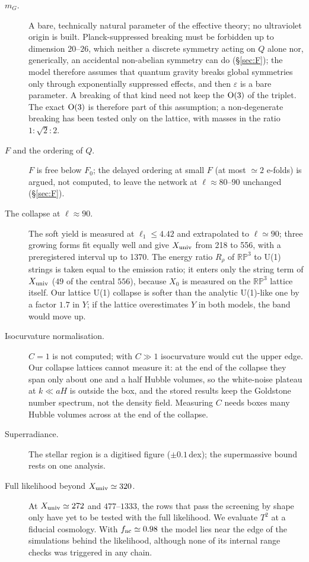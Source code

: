 \documentclass[11pt,a4paper]{article}
\newcommand{\RP}{\mathbb{RP}^3}
\newcommand{\Xu}{X_{\rm univ}}
\begin{document}
\begin{description}
\item[$m_G$.] A bare, technically natural parameter of the effective theory; no ultraviolet origin is built. Planck-suppressed breaking must be forbidden up to dimension $20$--$26$, which neither a discrete symmetry acting on $Q$ alone nor, generically, an accidental non-abelian symmetry can do (\S\ref{sec:F}); the model therefore assumes that quantum gravity breaks global symmetries only through exponentially suppressed effects, and then $\varepsilon$ is a bare parameter. A breaking of that kind need not keep the ${\rm O}(3)$ of the triplet. The exact ${\rm O}(3)$ is therefore part of this assumption; a non-degenerate breaking has been tested only on the lattice, with masses in the ratio $1:\sqrt2:2$.
\item[$F$ and the ordering of $Q$.] $F$ is free below $F_0$; the delayed ordering at small $F$ (at most $\simeq2$ e-folds) is argued, not computed, to leave the network at $\ell\approx80$--$90$ unchanged (\S\ref{sec:F}).
\item[The collapse at $\ell\approx90$.] The soft yield is measured at $\ell_1\le4.42$ and extrapolated to $\ell\simeq90$; three growing forms fit equally well and give $\Xu$ from 218 to 556, with a preregistered interval up to 1370. The energy ratio $R_\rho$ of $\RP$ to U(1) strings is taken equal to the emission ratio; it enters only the string term of $\Xu$ ($49$ of the central $556$), because $X_0$ is measured on the $\RP$ lattice itself. Our lattice U(1) collapse is softer than the analytic U(1)-like one by a factor $1.7$ in $Y$; if the lattice overestimates $Y$ in both models, the band would move up.
\item[Isocurvature normalisation.] $C=1$ is not computed; with $C\gg1$ isocurvature would cut the upper edge. Our collapse lattices cannot measure it: at the end of the collapse they span only about one and a half Hubble volumes, so the white-noise plateau at $k\ll aH$ is outside the box, and the stored results keep the Goldstone number spectrum, not the density field. Measuring $C$ needs boxes many Hubble volumes across at the end of the collapse.
\item[Superradiance.] The stellar region is a digitised figure ($\pm0.1$\,dex); the supermassive bound rests on one analysis.
\item[Full likelihood beyond $\Xu\simeq320$.] At $\Xu\simeq272$ and $477$--$1333$, the rows that pass the screening by shape only have yet to be tested with the full likelihood. We evaluate $T^2$ at a fiducial cosmology. With $f_{\rm nc}\simeq0.98$ the model lies near the edge of the simulations behind the likelihood, although none of its internal range checks was triggered in any chain.

\end{description}
\end{document}
